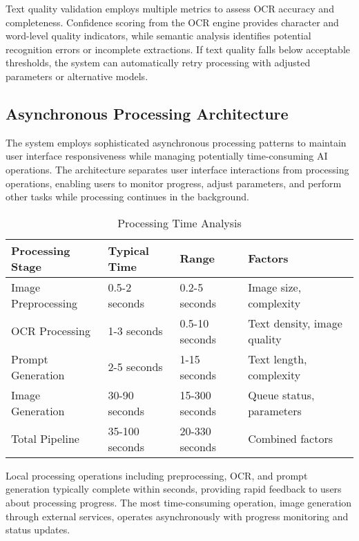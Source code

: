 Text quality validation employs multiple metrics to assess OCR accuracy and completeness. Confidence scoring from the OCR engine provides character and word-level quality indicators, while semantic analysis identifies potential recognition errors or incomplete extractions. If text quality falls below acceptable thresholds, the system can automatically retry processing with adjusted parameters or alternative models.

\subsection{Asynchronous Processing Architecture}

The system employs sophisticated asynchronous processing patterns to maintain user interface responsiveness while managing potentially time-consuming AI operations. The architecture separates user interface interactions from processing operations, enabling users to monitor progress, adjust parameters, and perform other tasks while processing continues in the background.

\begin{table}[H]
\centering
\caption{Processing Time Analysis}
\label{tab:processing_times}
\begin{tabular}{|l|l|l|l|}
\hline
\textbf{Processing Stage} & \textbf{Typical Time} & \textbf{Range} & \textbf{Factors} \\
\hline
Image Preprocessing & 0.5-2 seconds & 0.2-5 seconds & Image size, complexity \\
\hline
OCR Processing & 1-3 seconds & 0.5-10 seconds & Text density, image quality \\
\hline
Prompt Generation & 2-5 seconds & 1-15 seconds & Text length, complexity \\
\hline
Image Generation & 30-90 seconds & 15-300 seconds & Queue status, parameters \\
\hline
Total Pipeline & 35-100 seconds & 20-330 seconds & Combined factors \\
\hline
\end{tabular}
\end{table}

Local processing operations including preprocessing, OCR, and prompt generation typically complete within seconds, providing rapid feedback to users about processing progress. The most time-consuming operation, image generation through external services, operates asynchronously with progress monitoring and status updates.

